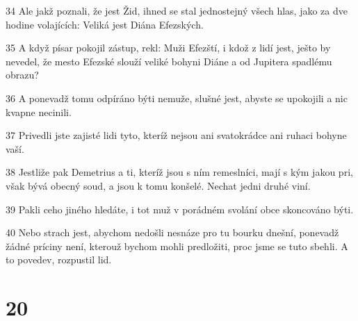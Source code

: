 \par 34 Ale jakž poznali, že jest Žid, ihned se stal jednostejný všech hlas, jako za dve hodine volajících: Veliká jest Diána Efezských.
\par 35 A když písar pokojil zástup, rekl: Muži Efezští, i kdož z lidí jest, ješto by nevedel, že mesto Efezské slouží veliké bohyni Diáne a od Jupitera spadlému obrazu?
\par 36 A ponevadž tomu odpíráno býti nemuže, slušné jest, abyste se upokojili a nic kvapne necinili.
\par 37 Privedli jste zajisté lidi tyto, kteríž nejsou ani svatokrádce ani ruhaci bohyne vaší.
\par 38 Jestliže pak Demetrius a ti, kteríž jsou s ním remeslníci, mají s kým jakou pri, však bývá obecný soud, a jsou k tomu konšelé. Nechat jedni druhé viní.
\par 39 Pakli ceho jiného hledáte, i tot muž v porádném svolání obce skoncováno býti.
\par 40 Nebo strach jest, abychom nedošli nesnáze pro tu bourku dnešní, ponevadž žádné príciny není, kterouž bychom mohli predložiti, proc jsme se tuto sbehli. A to povedev, rozpustil lid.

\chapter{20}

